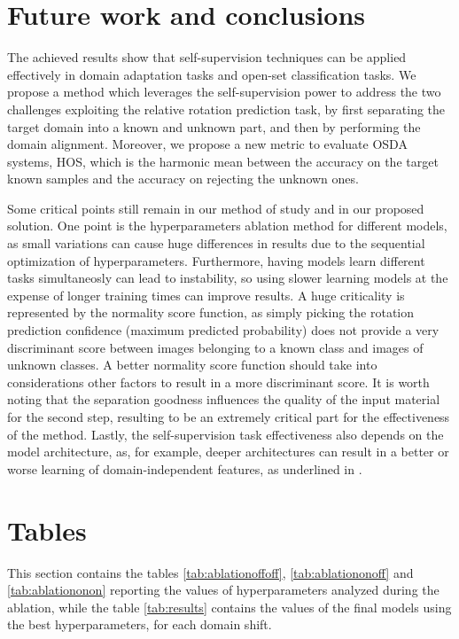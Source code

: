 \documentclass[10pt,twocolumn,letterpaper]{article}
\begin{document}
\section{Future work and conclusions}
\label{sec:future_work}

The achieved results show that self-supervision techniques can be applied effectively in domain adaptation tasks and open-set classification tasks.
We propose a method which leverages the self-supervision power to address the two challenges exploiting the relative rotation prediction task,
by first separating the target domain into a known and unknown part, and then by performing the domain alignment.
Moreover, we propose a new metric to evaluate OSDA systems, HOS, which is the harmonic mean between
the accuracy on the target known samples and the accuracy on rejecting the unknown ones.

Some critical points still remain in our method of study and in our proposed solution.
One point is the hyperparameters ablation method for different models,
as small variations can cause huge differences in results due to
the sequential optimization of hyperparameters.
Furthermore,
having models learn different tasks simultaneosly can lead to instability, 
so using slower learning models at the expense of longer training times can improve results.
A huge criticality is represented by the normality score function,
as simply picking the rotation prediction confidence (maximum predicted probability)
does not provide a very discriminant score between images belonging to a known class
and images of unknown classes.
A better normality score function should take into considerations other factors to result in a more discriminant score.
It is worth noting that the separation goodness influences the quality of the input material for the second step,
resulting to be an extremely critical part for the effectiveness of the method.
Lastly, the self-supervision task effectiveness also depends on the model architecture,
as, for example, deeper architectures can result in a better or worse learning
of domain-independent features, as underlined in \cite{OldROS}.

\appendix

\section{Tables}
\label{sec:tables}

This section contains the tables \ref{tab:ablationoffoff}, \ref{tab:ablationonoff} and \ref{tab:ablationonon}
reporting the values of hyperparameters analyzed during the ablation,
while the table \ref{tab:results} contains the values of the final models using the best hyperparameters,
for each domain shift.
\end{document}
